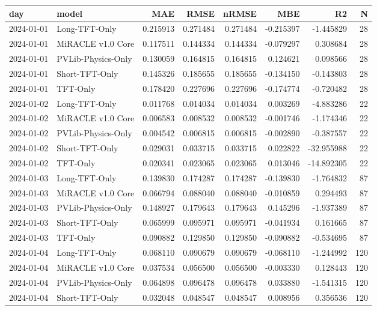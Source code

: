 \begin{tabular}{llrrrrrr}
\toprule
day & model & MAE & RMSE & nRMSE & MBE & R2 & N \\
\midrule
2024-01-01 & Long-TFT-Only & 0.215913 & 0.271484 & 0.271484 & -0.215397 & -1.445829 & 28 \\
2024-01-01 & MiRACLE v1.0 Core & 0.117511 & 0.144334 & 0.144334 & -0.079297 & 0.308684 & 28 \\
2024-01-01 & PVLib-Physics-Only & 0.130059 & 0.164815 & 0.164815 & 0.124621 & 0.098566 & 28 \\
2024-01-01 & Short-TFT-Only & 0.145326 & 0.185655 & 0.185655 & -0.134150 & -0.143803 & 28 \\
2024-01-01 & TFT-Only & 0.178420 & 0.227696 & 0.227696 & -0.174774 & -0.720482 & 28 \\
2024-01-02 & Long-TFT-Only & 0.011768 & 0.014034 & 0.014034 & 0.003269 & -4.883286 & 22 \\
2024-01-02 & MiRACLE v1.0 Core & 0.006583 & 0.008532 & 0.008532 & -0.001746 & -1.174346 & 22 \\
2024-01-02 & PVLib-Physics-Only & 0.004542 & 0.006815 & 0.006815 & -0.002890 & -0.387557 & 22 \\
2024-01-02 & Short-TFT-Only & 0.029031 & 0.033715 & 0.033715 & 0.022822 & -32.955988 & 22 \\
2024-01-02 & TFT-Only & 0.020341 & 0.023065 & 0.023065 & 0.013046 & -14.892305 & 22 \\
2024-01-03 & Long-TFT-Only & 0.139830 & 0.174287 & 0.174287 & -0.139830 & -1.764832 & 87 \\
2024-01-03 & MiRACLE v1.0 Core & 0.066794 & 0.088040 & 0.088040 & -0.010859 & 0.294493 & 87 \\
2024-01-03 & PVLib-Physics-Only & 0.148927 & 0.179643 & 0.179643 & 0.145296 & -1.937389 & 87 \\
2024-01-03 & Short-TFT-Only & 0.065999 & 0.095971 & 0.095971 & -0.041934 & 0.161665 & 87 \\
2024-01-03 & TFT-Only & 0.090882 & 0.129850 & 0.129850 & -0.090882 & -0.534695 & 87 \\
2024-01-04 & Long-TFT-Only & 0.068110 & 0.090679 & 0.090679 & -0.068110 & -1.244992 & 120 \\
2024-01-04 & MiRACLE v1.0 Core & 0.037534 & 0.056500 & 0.056500 & -0.003330 & 0.128443 & 120 \\
2024-01-04 & PVLib-Physics-Only & 0.064898 & 0.096478 & 0.096478 & 0.033880 & -1.541315 & 120 \\
2024-01-04 & Short-TFT-Only & 0.032048 & 0.048547 & 0.048547 & 0.008956 & 0.356536 & 120 \\

\end{tabular}
